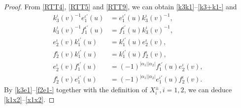 \documentclass[a4paper,12pt]{article}
\numberwithin{equation}{section}
\begin{document}
\begin{proof}
From \eqref{RTT4}, \eqref{RTT5} and \eqref{RTT9}, we can obtain \eqref{k3k1}--\eqref{k3+k1-} and
\begin{align}\label{k3e1}
k_{3}^{\iota}(v)^{-1}e_1^{\iota'}(u)&=e_1^{\iota'}(u)k_{3}^{\iota}(v)^{-1},\\ \label{k3f1}
k_{3}^{\iota}(v)^{-1}f_{1}^{\iota'}(u)&=f_{1}^{\iota'}(u)k_{3}^{\iota}(v)^{-1},\\ \label{k1e2}
e_{2}^{\iota}(v)k_{1}^{\iota'}(u)&=k_{1}^{\iota'}(u)e_{2}^{\iota}(v),\\ \label{k1f2}
f_{2}^{\iota}(v)k_{1}^{\iota'}(u)&=k_{1}^{\iota'}(u)f_{2}^{\iota}(v),\\ \label{e2f1+}
e_{2}^{\iota}(v)f_{1}^{\iota'}(u)&=(-1)^{|\alpha_{1}||\alpha_{2}|}
f_{1}^{\iota'}(u)e_{2}^{\iota}(v),\\  \label{f2e1-}
f_{2}^{\iota}(v)e_{1}^{\iota'}(u)&=(-1)^{|\alpha_{1}||\alpha_{2}|}
e_{1}^{\iota'}(u)f_{2}^{\iota}(v).
\end{align}
By \eqref{k3e1}--\eqref{f2e1-} together with the definition of $X_{i}^{\pm}, i=1,2$, we can deduce \eqref{k1x2}--\eqref{x1x2}.


\end{proof}
\end{document}
